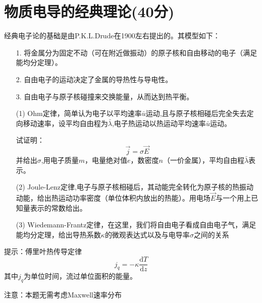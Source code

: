 \documentclass{article}
\begin{document}
\section*{物质电导的经典理论(40分)}
经典电子论的基础是由P.K.L.Drude在1900左右提出的。其模型如下：
\begin{itemize}
\item[1.]将金属分为固定不动（可在附近做振动）的原子核和自由移动的电子（满足能均分定理）。
\item[2.]自由电子的运动决定了金属的导热性与导电性。
\item[3.]自由电子与原子核碰撞来交换能量，从而达到热平衡。
\end{itemize}
\begin{itemize}
\item[(1)]Ohm定律，简单认为电子以平均速率$\bar{u}$运动,且与原子核相碰后完全失去定向移动速率，设平均自由程为$\bar{\lambda}$,电子热运动以热运动平均速率$\bar{u}$运动。\par
试证明：
\[
\vec{j}=\sigma\vec{E}
\]
并给出$\sigma$,用电子质量$m$，电量绝对值$e$，数密度$n$（一价金属），平均自由程$\bar{\lambda}$表示。
\item[(2)]Joule-Lenz定律,电子与原子核相碰后，其动能完全转化为原子核的热振动动能，给出热运动功率密度（单位体积内放出的热能）。用电场$\vec{E}$与一个用上已知量表示的常数给出。
\item[(3)]Wiedemann-Frantz定律，在这里，我们将自由电子看成自由电子气，满足能均分定理，给出导热系数$\kappa$的微观表达式以及与电导率$\sigma$之间的关系
\end{itemize}
\par
提示：傅里叶热传导定律
\[
j_q=-\kappa\dfrac{\mathrm{d}T}{\mathrm{d}z}
\]
其中$j_q$为单位时间，流过单位面积的能量。\par
注意：本题无需考虑Maxwell速率分布
\end{document}
